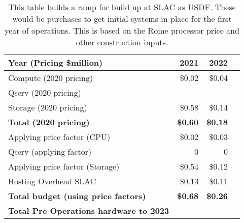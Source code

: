 \tiny \begin{longtable} { |p{}  |r  |r  |r |} 
\caption{This table builds a ramp for build up at SLAC as USDF. These would be purchases to get initial systems in place for the first year of operations. This is based on the Rome processor price and other construction inputs. \label{tab:preOps}}\\ 
\hline 
\textbf{Year (Pricing \$million)}&\textbf{2021}&\textbf{2022} \\ \hline
{Compute (2020 pricing)}&{\$0.02}&{\$0.04} \\ \hline
{Qserv (2020 pricing)}&{}&{} \\ \hline
{Storage (2020 pricing)}&{\$0.58}&{\$0.14} \\ \hline
\textbf{Total (2020 pricing)}&\textbf{\$0.60}&\textbf{\$0.18} \\ \hline
{Applying price factor (CPU)}&{\$0.02}&{\$0.03} \\ \hline
{Qserv (applying factor)}&{0}&{0} \\ \hline
{Applying price factor (Storage)}&{\$0.54}&{\$0.12} \\ \hline
{Hosting Overhead SLAC}&{\$0.13}&{\$0.11} \\ \hline
\textbf{Total budget (using price factors)}&\textbf{\$0.68}&\textbf{\$0.26} \\ \hline
\textbf{Total Pre Operations hardware to 2023}&& \\ \hline
\end{longtable} \normalsize
